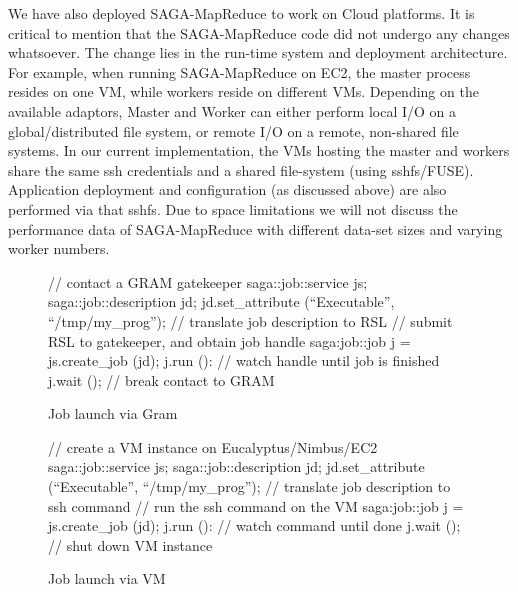 \documentclass[conference,final]{IEEEtran}
\newcommand{\sagamapreduce }{SAGA-MapReduce }
\newcommand{\upp}{\vspace*{-0.5em}}
\begin{document}
We have also deployed \sagamapreduce to work on Cloud platforms.  It
is critical to mention that the \sagamapreduce code did not undergo
any changes whatsoever. The change lies in the run-time system and
deployment architecture. For example, when running \sagamapreduce on
EC2, the master process resides on one VM, while workers reside on
different VMs.  Depending on the available adaptors, Master and Worker
can either perform local I/O on a global/distributed file system, or
remote I/O on a remote, non-shared file systems.  In our current
implementation, the VMs hosting the master and workers share the same
ssh credentials and a shared file-system (using sshfs/FUSE).
Application deployment and configuration (as discussed above) are also
performed via that sshfs.  Due to space limitations we will not
discuss the performance data of \sagamapreduce with different data-set
sizes and varying worker numbers.

\begin{figure}[!ht]
\upp
 \begin{center}
  \begin{mycode}[label=SAGA Job Launch via GRAM gatekeeper]
   { // contact a GRAM gatekeeper
    saga::job::service     js;
    saga::job::description jd;
    jd.set_attribute (``Executable'', ``/tmp/my_prog'');
    // translate job description to RSL
    // submit RSL to gatekeeper, and obtain job handle
    saga:job::job j = js.create_job (jd);
    j.run ():
    // watch handle until job is finished
    j.wait ();
   } // break contact to GRAM
  \end{mycode}
  \caption{\label{gramjob}Job launch via Gram }
 \end{center}
\upp
\end{figure}

\begin{figure}[!ht]
\upp
 \begin{center}
  \begin{mycode}[label=SAGA create a VM instance on a Cloud]
   {// create a VM instance on Eucalyptus/Nimbus/EC2
    saga::job::service     js;
    saga::job::description jd;
    jd.set_attribute (``Executable'', ``/tmp/my_prog'');
    // translate job description to ssh command
    // run the ssh command on the VM
    saga:job::job j = js.create_job (jd);
    j.run ():
    // watch command until done
    j.wait ();
   } // shut down VM instance
  \end{mycode}
  \caption{\label{vmjob} Job launch via VM}
 \end{center}
\upp
\end{figure}
\end{document}
